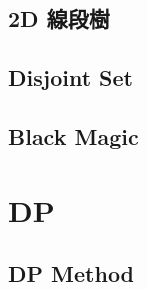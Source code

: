 \documentclass[a4paper,10pt,twocolumn,oneside]{article}
\begin{document}
\subsection{2D 線段樹}


% 

% 

% 

\subsection{Disjoint Set}


%

%

\subsection{Black Magic}


\section{DP}

\subsection{DP Method}
\end{document}
